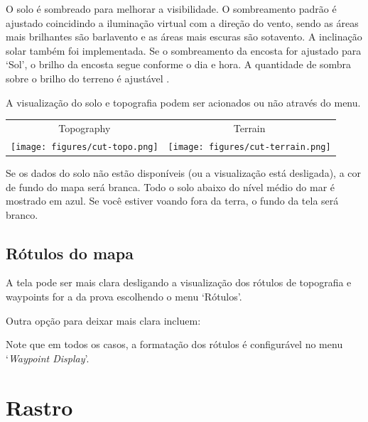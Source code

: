 O solo é sombreado para melhorar a visibilidade.  O sombreamento padrão é ajustado 
coincidindo a iluminação virtual com a direção do vento, sendo as áreas mais brilhantes 
são barlavento e as áreas mais escuras são sotavento.   
A inclinação solar também foi implementada.  Se o sombreamento da encosta for ajustado 
para ‘Sol’, o brilho da encosta segue conforme o dia e hora.  A quantidade de sombra sobre 
o brilho do terreno é ajustável .

A visualização do solo e topografia podem ser acionados ou não através do menu.

\begin{tabular}{c c}
Topography & Terrain \\
\texttt{[image: figures/cut-topo.png]} &
\texttt{[image: figures/cut-terrain.png]} \\
\end{tabular}

Se os dados do solo não estão disponíveis (ou a visualização está desligada), a cor de fundo do mapa será branca.  Todo o solo abaixo do nível médio do mar é mostrado em azul.  Se você estiver voando fora da terra, o fundo da tela será branco.  

\subsection*{Rótulos do mapa}\label{sec:maplabels}

A tela pode ser mais clara desligando a visualização dos rótulos de topografia e waypoints for a da prova escolhendo o menu ‘Rótulos’.

Outra opção para deixar mais clara incluem:



Note que em todos os casos, a formatação dos rótulos é configurável no menu
`{\it Waypoint Display}'.  


\section{Rastro}\label{sec:trail}


